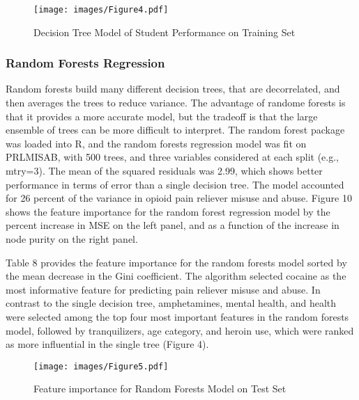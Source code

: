 \documentclass[sigconf]{acmart}
\begin{document}
\begin{figure}[!ht]
  \centering\texttt{[image: images/Figure4.pdf]}
  \caption{Decision Tree Model of Student Performance on Training Set}
  \label{f:Figure4}
\end{figure}


\subsubsection{Random Forests Regression}





Random forests build many different decision trees, that are decorrelated, and 
then averages the trees to reduce variance. The advantage of randome forests is 
that it provides a more accurate model, but the tradeoff is that the large 
ensemble of trees can be more difficult to interpret. The random forest package 
was loaded into R, and the random forests regression model was fit on PRLMISAB, 
with 500 trees, and three variables considered at each split (e.g., mtry=3).
The mean of the squared residuals was 2.99, which shows better performance
in terms of error than a single decision tree. The model accounted for 26
percent of the variance in opioid pain reliever misuse and abuse. Figure 10
shows the feature importance for the random forest regression model by the
percent increase in MSE on the left panel, and as a function of the increase
in node purity on the right panel. 




Table 8 provides the feature importance for 
the random forests model sorted by the mean decrease in the Gini coefficient. 
The algorithm selected cocaine as the most informative feature for predicting 
pain reliever misuse and abuse. In contrast to the single decision tree, 
amphetamines, mental health, and health were selected among the top four most 
important features in the random forests model, followed by tranquilizers, 
age category, and heroin use, which were ranked as more influential in the 
single tree (Figure 4). 

\begin{figure}[!ht]
  \centering\texttt{[image: images/Figure5.pdf]}
  \caption{Feature importance for Random Forests Model on Test Set}
  \label{f:Figure5}
\end{figure}
\end{document}
